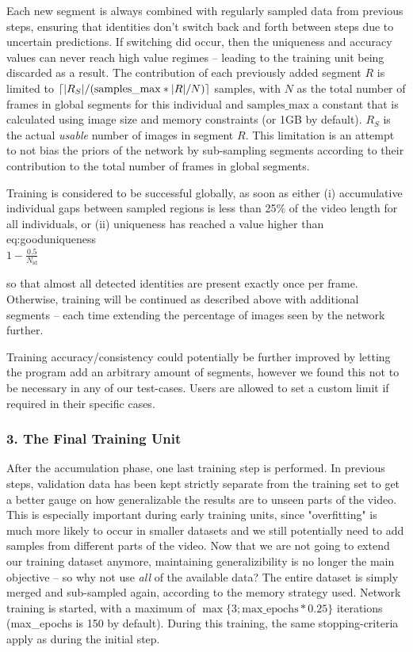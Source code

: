 \documentclass[9pt,lineno]{elife}
\makeatletter
\DeclarePairedDelimiter\ceil{\lceil}{\rceil}
\newcommand{\changemade}[1]{#1}
\newcommand*{\inlineequation}[2][]{%
  \begingroup
    \refstepcounter{equation}%
    \ifx\\#1\\%
    \else
      \label{#1}%
    \fi
    \relpenalty=10000 %
    \binoppenalty=10000 %
    \ensuremath{%
      #2%
    }%
    ~\@eqnnum
  \endgroup
}
\makeatother
\begin{document}
Each new segment is always combined with regularly sampled data from previous steps, ensuring that identities don't switch back and forth between steps due to uncertain predictions. If switching did occur, then the uniqueness and accuracy values can never reach high value regimes -- leading to the training unit being discarded as a result. The contribution of each previously added segment $R$ is limited to $\ceil{|R_S| / ( \mathrm{samples\_max} * |R| / N )}$ samples, with $N$ as the total number of frames in global segments for this individual and $\mathrm{samples\_max}$ a constant that is calculated using image size and memory constraints (or 1GB by default). $R_S$ is the actual \textit{usable} number of images in segment $R$. This limitation is an attempt to not bias the priors of the network by sub-sampling segments according to their contribution to the total number of frames in global segments.


Training is considered to be successful globally, as soon as either (i) accumulative individual gaps between sampled regions is less than 25\% of the video length for all individuals, or (ii) uniqueness has reached a value higher than \changemade{
\inlineequation[eq:gooduniqueness]{1-\frac{0.5}{N_{\mathrm{id}}}} }
so that almost all detected identities are present exactly once per frame. Otherwise, training will be continued as described above with additional segments -- each time extending the percentage of images seen by the network further.

Training accuracy/consistency could potentially be further improved by letting the program add an arbitrary amount of segments, however we found this not to be necessary in any of our test-cases. Users are allowed to set a custom limit if required in their specific cases.

\subsubsection{3. The Final Training Unit}

After the accumulation phase, one last training step is performed. In previous steps, validation data has been kept strictly separate from the training set to get a better gauge on how generalizable the results are to unseen parts of the video. \changemade{This is especially important during early training units, since "overfitting" is much more likely to occur in smaller datasets and we still potentially need to add samples from different parts of the video. Now that we are not going to extend our training dataset anymore, maintaining generalizibility is no longer the main} objective -- so why not use \textit{all} of the available data? The entire dataset is simply merged and sub-sampled again, according to the memory strategy used. Network training is started, with a maximum of $\max\{ 3; \mathrm{max\_epochs} * 0.25 \}$ iterations (max\_epochs is 150 by default). During this training, the same stopping-criteria apply as during the initial step.
\end{document}
